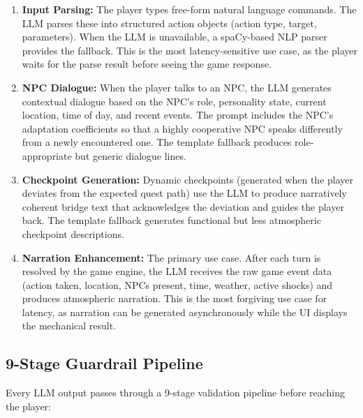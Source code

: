 \documentclass[12pt, a4paper, oneside]{report}
\begin{document}
\begin{enumerate}[nosep]
    \item \textbf{Input Parsing:} The player types free-form natural language commands. The LLM parses these into structured action objects (action type, target, parameters). When the LLM is unavailable, a spaCy-based NLP parser provides the fallback. This is the most latency-sensitive use case, as the player waits for the parse result before seeing the game response.
    \item \textbf{NPC Dialogue:} When the player talks to an NPC, the LLM generates contextual dialogue based on the NPC's role, personality state, current location, time of day, and recent events. The prompt includes the NPC's adaptation coefficients so that a highly cooperative NPC speaks differently from a newly encountered one. The template fallback produces role-appropriate but generic dialogue lines.
    \item \textbf{Checkpoint Generation:} Dynamic checkpoints (generated when the player deviates from the expected quest path) use the LLM to produce narratively coherent bridge text that acknowledges the deviation and guides the player back. The template fallback generates functional but less atmospheric checkpoint descriptions.
    \item \textbf{Narration Enhancement:} The primary use case. After each turn is resolved by the game engine, the LLM receives the raw game event data (action taken, location, NPCs present, time, weather, active shocks) and produces atmospheric narration. This is the most forgiving use case for latency, as narration can be generated asynchronously while the UI displays the mechanical result.
\end{enumerate}

\subsection{9-Stage Guardrail Pipeline}

Every LLM output passes through a 9-stage validation pipeline before reaching the player:
\end{document}
